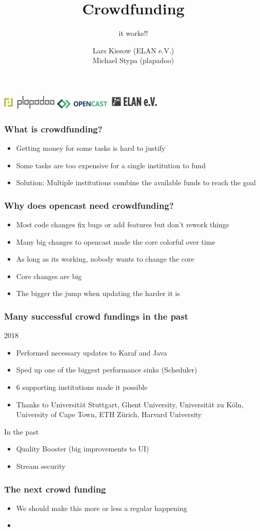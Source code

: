 \documentclass[t,aspectratio=169]{beamer}
\title{Crowdfunding}
\subtitle{it works!!}
\author{Lars Kiesow (ELAN e.V.)\\\vspace{1em}Michael Stypa (plapadoo)}
\begin{document}
\begin{frame}
  \titlepage
  \includegraphics[width=7em]{plapadoo.pdf}
  \hfill
  \includegraphics[width=7em]{opencast.pdf}
  \hfill
  \includegraphics[width=7em]{elan.pdf}
\end{frame}

\begin{frame}[c]
  \frametitle{What is crowdfunding?}
  \begin{itemize}
    \item Getting money for some tasks is hard to justify
    \item Some tasks are too expensive for a single institution to fund
    \item Solution: Multiple institutions combine the available funds to reach the goal
  \end{itemize}
\end{frame}

\begin{frame}[c]
  \frametitle{Why does opencast need crowdfunding?}
  \begin{itemize}
    \item Most code changes fix bugs or add features but don't rework things
    \item Many big changes to opencast made the core colorful over time
    \item As long as its working, nobody wants to change the core
    \item Core changes are big
    \item The bigger the jump when updating the harder it is
  \end{itemize}
\end{frame}

\begin{frame}[c]
  \frametitle{Many successful crowd fundings in the past}
  2018
  \begin{itemize}
    \item Performed necessary updates to Karaf and Java
    \item Sped up one of the biggest performance sinks (Scheduler)
    \item 6 supporting institutions made it possible
    \item Thanks to Universität Stuttgart, Ghent University, Universität zu Köln, University of Cape Town, ETH Zürich, Harvard University
  \end{itemize}
  In the past
  \begin{itemize}
    \item Quality Booster (big improvements to UI)
    \item Stream security
  \end{itemize}
\end{frame}

\begin{frame}[c]
  \frametitle{The next crowd funding}
  \begin{itemize}
    \item We should make this more or less a regular happening
    \item 
  \end{itemize}
\end{frame}
\end{document}
